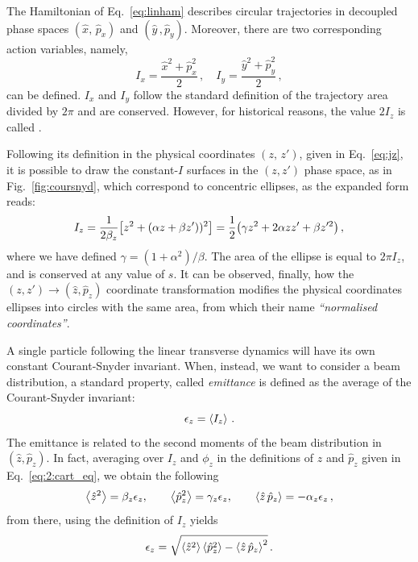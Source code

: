 The Hamiltonian of Eq.~\eqref{eq:linham} describes circular trajectories in decoupled phase spaces $(\hat x,\,\hat p_x)$ and $(\hat y\,, \hat p_y)$. Moreover, there are two corresponding action variables, namely,
\begin{equation}
    I_x = \frac{\hat x^2 +\hat p_x^2}{2}\,, \quad I_y=\frac{\hat y^2+\hat p_y^2}{2} \,,
\end{equation}
can be defined. $I_x$ and $I_y$ follow the standard definition of the trajectory area divided by $2\pi$ and are conserved. However, for historical reasons, the value $2I_z$ is called .

Following its definition in the physical coordinates $(z,\, z')$, given in Eq.~\eqref{eq:jz}, it is possible to draw the constant-$I$ surfaces in the $(z,z')$ phase space, as in Fig.~\ref{fig:coursnyd}, which correspond to concentric ellipses, as the expanded form reads:
%
\begin{equation}
I_z = \frac{1}{2\beta_z}\qty[z^2 + (\alpha z + \beta z'))^2] = \frac{1}{2}\qty(\gamma z^2 + 2\alpha z z' + \beta z'^2)\,, \end{equation}
%
where we have defined $\gamma=(1+\alpha^2)/\beta$. The area of the ellipse is equal to $2\pi I_z$, and is conserved at any value of $s$. It can be observed, finally, how the $(z,z')\to(\hat z,\hat p_z)$ coordinate transformation modifies the physical coordinates ellipses into circles with the same area, from which their name \textit{``normalised coordinates''}.

A single particle following the linear transverse dynamics will have its own constant Courant-Snyder invariant. When, instead, we want to consider a beam distribution, a standard property, called \textit{emittance} is defined as the average of the Courant-Snyder invariant:
\begin{equation}
    \epsilon_z = \left<{I_z}\right> \,.
\end{equation}
The emittance is related to the second moments of the beam distribution in $(\hat z,\hat p_z)$. In fact, averaging over $I_z$ and $\phi_z$ in the definitions of $\hat z$ and $\hat p_z$ given in Eq.~\eqref{eq:2:cart_eq}, we obtain the following
%
\begin{equation}
	\left<{\hat z^2}\right> = \beta_z \epsilon_z, \qquad \left<{\hat p_z^2}\right>=\gamma_z \epsilon_z, \qquad \left<{\hat z\,\hat p_z}\right>=-\alpha_z\epsilon_z\,,
\end{equation}
%
from there, using the definition of $I_z$ yields
\begin{equation}
	\epsilon_z = \sqrt{ \left<{\hat z^2}\right>\left<{\hat p_z^2}\right> - \left<{\hat z \, \hat p_z}\right>^2 }\,.
\end{equation}

